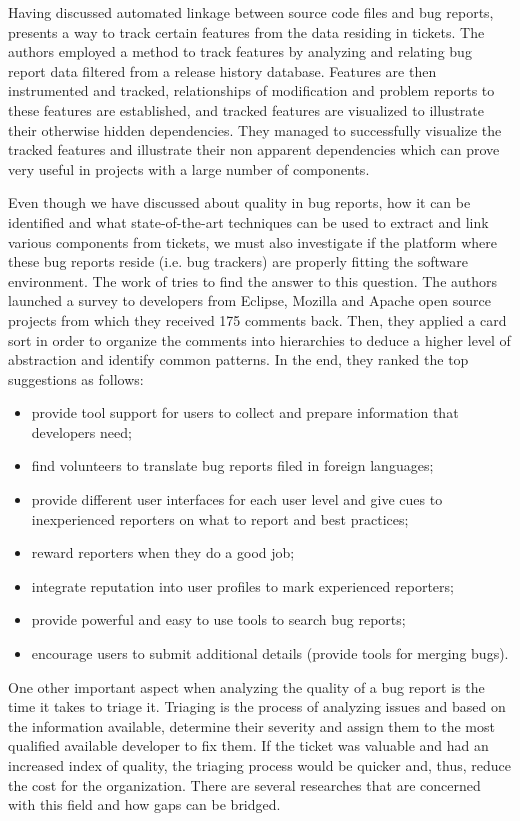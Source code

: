 \documentclass{mprop}
\begin{document}
Having discussed automated linkage between source code files and bug reports, 
\citet{fischer2003analyzing} presents a way to track certain features from the
data residing in tickets. The authors employed a method to track features by 
analyzing and relating bug report data filtered from a release history database.
Features are then instrumented and tracked, relationships of modification and 
problem reports to these features are established, and tracked features are
visualized to illustrate their otherwise hidden dependencies. They managed to 
successfully visualize the tracked features and illustrate their non apparent
dependencies which can prove very useful in projects with a large number of
components.

Even though we have discussed about quality in bug reports, how it can be 
identified and what state-of-the-art techniques can be used to extract and 
link various components from tickets, we must also investigate if the platform 
where these bug reports 
reside (i.e. bug trackers) are properly fitting the software environment. 
The work of \citet{just2008towards} tries to find the answer to this question.
The authors launched a survey to developers from Eclipse, Mozilla and Apache
open source projects from which they received 175 comments back. Then, they
applied a card sort in order to organize the comments into hierarchies to 
deduce a higher level of abstraction and identify common patterns. In the end,
they ranked the top suggestions as follows:
  \begin{itemize}
    \item provide tool support for users to collect and prepare information that 
      developers need;
    \item find volunteers to translate bug reports filed in foreign languages;
    \item provide different user interfaces for each user level and give cues to 
      inexperienced reporters on what to report and best practices;
    \item reward reporters when they do a good job;
    \item integrate reputation into user profiles to mark experienced reporters;
    \item provide powerful and easy to use tools to search bug reports;
    \item encourage users to submit additional details (provide tools for merging 
      bugs).
  \end{itemize}

One other important aspect when analyzing the quality of a bug report is the
time it takes to triage it. Triaging is the process of analyzing issues and 
based on the information available, determine their severity and assign them to the
most qualified available developer to fix them. If the ticket was valuable and had 
an increased index of quality, the triaging process would be quicker and,
thus, reduce the cost for the organization. There are several researches that 
are concerned with this field and how gaps can be bridged.
\end{document}
